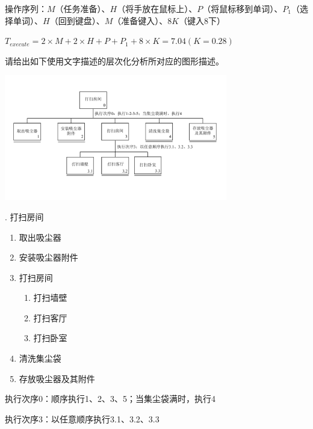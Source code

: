 \begin{solution}
操作序列：$M$（任务准备）、$H$（将手放在鼠标上）、$P$（将鼠标移到单词）、$P_1$（选择单词）、$H$（回到键盘）、$M$（准备键入）、$8K$（键入8下）
    
$T_{execute} =2\times M+ 2\times H + P +P_1 + 8\times K=7.04 (K=0.28)$
\end{solution}


\begin{problem}[2013]
请给出如下使用文字描述的层次化分析所对应的图形描述。
\end{problem}

\begin{solution}

\begin{table}
    \centering
    \vspace{-1.5em}
    \includegraphics[width=0.73\textwidth]{21.pdf}
    \vspace{-3.5em}
\end{table}
{. 打扫房间
\vspace{-0.2em}
\begin{enumerate}[label=\arabic*.]
    \item 取出吸尘器
    \item 安装吸尘器附件
    \item 打扫房间
    \vspace{-0.3em}
    \begin{enumerate}[label=3.\arabic*.]
        \item 打扫墙壁
        \item 打扫客厅
        \item 打扫卧室
    \end{enumerate}
    \item 清洗集尘袋
    \item 存放吸尘器及其附件
\end{enumerate}
执行次序0：顺序执行1、2、3、5；当集尘袋满时，执行4

执行次序3：以任意顺序执行3.1、3.2、3.3}
\end{solution}



